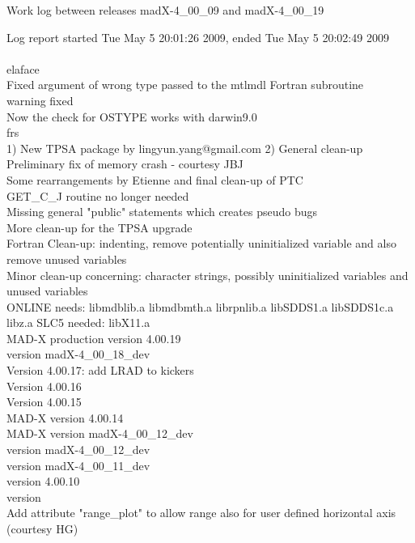 Work log between releases madX-4\_00\_09 and madX-4\_00\_19 

Log report started Tue May  5 20:01:26 2009, ended Tue May  5 20:02:49 2009
\\
\\
elaface \\ 
 Fixed argument of wrong type passed to the mtlmdl Fortran subroutine  \\ 
  warning fixed  \\ 
 Now the check for OSTYPE works with darwin9.0  \\ 
frs \\ 
1) New TPSA package by lingyun.yang@gmail.com 2) General clean-up  \\ 
Preliminary fix of memory crash - courtesy JBJ  \\ 
Some rearrangements by Etienne and final clean-up of PTC  \\ 
GET\_C\_J routine no longer needed  \\ 
Missing general "public" statements which creates pseudo bugs  \\ 
More clean-up for the TPSA upgrade  \\ 
Fortran Clean-up: indenting, remove potentially uninitialized variable and also remove unused variables  \\ 
Minor clean-up concerning: character strings, possibly uninitialized variables and unused variables  \\ 
ONLINE needs: libmdblib.a libmdbmth.a librpnlib.a libSDDS1.a libSDDS1c.a libz.a SLC5 needed: libX11.a  \\ 
MAD-X production version 4.00.19  \\ 
version madX-4\_00\_18\_dev  \\ 
Version 4.00.17: add LRAD to kickers  \\ 
Version 4.00.16  \\ 
Version 4.00.15  \\ 
MAD-X version 4.00.14  \\ 
MAD-X version madX-4\_00\_12\_dev  \\ 
version madX-4\_00\_12\_dev  \\ 
version madX-4\_00\_11\_dev  \\ 
version 4.00.10  \\ 
version  \\ 
Add attribute "range\_plot" to allow range also for user defined horizontal axis               (courtesy HG)  \\ 
